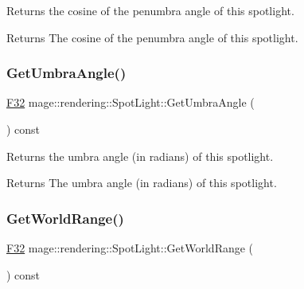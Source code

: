 Returns the cosine of the penumbra angle of this spotlight.

\begin{DoxyReturn}{Returns}
The cosine of the penumbra angle of this spotlight. 
\end{DoxyReturn}
\hypertarget{classmage_1_1rendering_1_1_spot_light_a2ad4020c60fcfd2fca7568fbefa601f0}{}\label{classmage_1_1rendering_1_1_spot_light_a2ad4020c60fcfd2fca7568fbefa601f0} 
\subsubsection{\texorpdfstring{Get\+Umbra\+Angle()}{GetUmbraAngle()}}
{\footnotesize\ttfamily \hyperlink{namespacemage_aa97e833b45f06d60a0a9c4fc22ae02c0}{F32} mage\+::rendering\+::\+Spot\+Light\+::\+Get\+Umbra\+Angle (\begin{DoxyParamCaption}{ }\end{DoxyParamCaption}) const\hspace{0.3cm}{\ttfamily [noexcept]}}

Returns the umbra angle (in radians) of this spotlight.

\begin{DoxyReturn}{Returns}
The umbra angle (in radians) of this spotlight. 
\end{DoxyReturn}
\hypertarget{classmage_1_1rendering_1_1_spot_light_a13b573af8d6131b6bf426362088a2a56}{}\label{classmage_1_1rendering_1_1_spot_light_a13b573af8d6131b6bf426362088a2a56} 
\subsubsection{\texorpdfstring{Get\+World\+Range()}{GetWorldRange()}}
{\footnotesize\ttfamily \hyperlink{namespacemage_aa97e833b45f06d60a0a9c4fc22ae02c0}{F32} mage\+::rendering\+::\+Spot\+Light\+::\+Get\+World\+Range (\begin{DoxyParamCaption}{ }\end{DoxyParamCaption}) const\hspace{0.3cm}{\ttfamily [noexcept]}}

